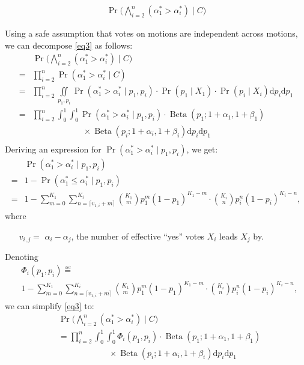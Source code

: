 \documentclass{sigchi}
\begin{document}
\begin{align}\label{eq3}
\Pr\bigg(\bigwedge_{i=2}^n (\alpha^*_1 > \alpha^*_i) \mid C\bigg)
\end{align}

Using a safe assumption that votes on motions are independent across motions, we can decompose \eqref{eq3} as follows:
\begin{align*}
& \Pr\bigg(\bigwedge_{i=2}^n (\alpha^*_1 > \alpha^*_i) \mid C\bigg)\\
=& \prod_{i=2}^n \Pr(\alpha^*_1 > \alpha^*_i \mid C)\\
=& \prod_{i=2}^n \iint\limits_{p_1, p_i} \Pr(\alpha^*_1 > \alpha^*_i \mid p_1, p_i) \cdot \Pr(p_1 \mid X_1) \cdot \Pr(p_i \mid X_i) \mathrm{d}p_i \mathrm{d}p_1\\
=& \prod_{i=2}^n \int_0^1 \int_0^1 \Pr(\alpha^*_1 > \alpha^*_i \mid p_1, p_i) \cdot \operatorname{Beta}(p_1; 1+\alpha_1,1+\beta_1) \\
& \qquad\qquad\qquad \times \operatorname{Beta}(p_i; 1+\alpha_i,1+\beta_i) \mathrm{d}p_i \mathrm{d}p_1\\
\end{align*}
Deriving an expression for $\Pr(\alpha^*_1 > \alpha^*_i \mid p_1, p_i)$, we get:
\begin{align*}
& \Pr(\alpha^*_1 > \alpha^*_i \mid p_1, p_i)\\
=& 1 - \Pr(\alpha^*_1 \leq \alpha^*_i \mid p_1, p_i)\\
=& 1 - \sum\limits_{m=0}^{K_1} \sum\limits_{n=\lceil{v_{1,i}+m}\rceil}^{K_i} {K_1 \choose m} p_1^{m} {(1-p_1)}^{K_1 - m} \cdot {K_i \choose n} p_i^{n} {(1-p_i)}^{K_i-n},
\end{align*}
where
\begin{description}
\begin{itemize}
\item[$v_{i,j} = $] $\alpha_i - \alpha_j$, the number of effective ``yes'' votes $X_i$ leads $X_j$ by.
\end{itemize}
\end{description}

Denoting
\begin{align}\label{eq4}
& \Phi_i(p_1,p_i) {\overset {\underset {\mathrm {def} }{}}{=}} \nonumber\\
& 1 - \sum\limits_{m=0}^{K_1} \sum\limits_{n=\lceil{v_{1,i}+m}\rceil}^{K_i} {K_1 \choose m} p_1^{m} {(1-p_1)}^{K_1 - m} \cdot {K_i \choose n} p_i^{n} {(1-p_i)}^{K_i-n},
\end{align}
we can simplify \eqref{eq3} to:
\begin{align}\label{eq5}
& \Pr\bigg(\bigwedge_{i=2}^n (\alpha^*_1 > \alpha^*_i) \mid C\bigg)\nonumber\\
&= \prod_{i=2}^n \int_0^1 \int_0^1 \Phi_i(p_1,p_i) \cdot \operatorname{Beta}(p_1; 1+\alpha_1,1+\beta_1) \nonumber\\
& \qquad\qquad\qquad \times \operatorname{Beta}(p_i; 1+\alpha_i,1+\beta_i) \mathrm{d}p_i \mathrm{d}p_1
\end{align}
\end{document}

